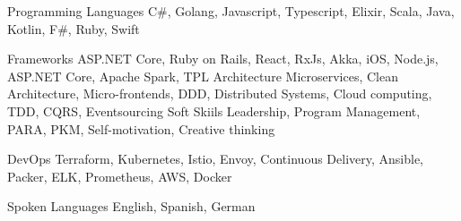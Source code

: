 

\begin{cvskills}

  \cvskill
    {Programming Languages} %
    {C\#, Golang, Javascript, Typescript, Elixir, Scala, Java, Kotlin, F\#, Ruby, Swift } %

  \cvskill
    {Frameworks} %
    {ASP.NET Core, Ruby on Rails, React, RxJs, Akka, iOS, Node.js, ASP.NET Core,
    Apache Spark, TPL} %
  \cvskill
    {Architecture} %
    {Microservices, Clean Architecture, Micro-frontends, DDD, Distributed
    Systems, Cloud computing, TDD, CQRS, Eventsourcing } %
  \cvskill
    {Soft Skiils} %
    {Leadership, Program Management, PARA, PKM, Self-motivation, Creative thinking} %

  \cvskill
    {DevOps} %
    { Terraform, Kubernetes, Istio, Envoy, Continuous Delivery, Ansible, Packer,
    ELK, Prometheus,
    AWS, Docker } %

\cvskill
{Spoken Languages} %
{ English, Spanish, German} %

\end{cvskills}
